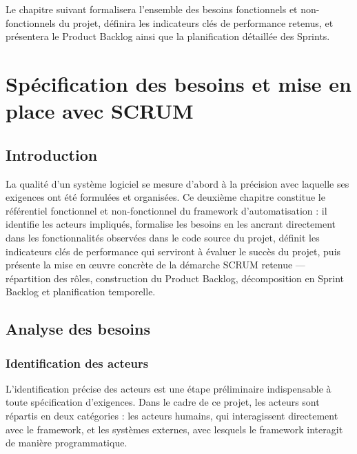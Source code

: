 \documentclass[12pt, a4paper]{report}
\begin{document}
Le chapitre suivant formalisera l'ensemble des besoins fonctionnels et non-fonctionnels du projet, définira les indicateurs clés de performance retenus, et présentera le Product Backlog ainsi que la planification détaillée des Sprints.

\newpage

\chapter{Spécification des besoins et mise en place avec SCRUM}

\section*{Introduction}

La qualité d'un système logiciel se mesure d'abord à la précision avec laquelle ses exigences ont été formulées et organisées. Ce deuxième chapitre constitue le référentiel fonctionnel et non-fonctionnel du framework d'automatisation : il identifie les acteurs impliqués, formalise les besoins en les ancrant directement dans les fonctionnalités observées dans le code source du projet, définit les indicateurs clés de performance qui serviront à évaluer le succès du projet, puis présente la mise en œuvre concrète de la démarche SCRUM retenue — répartition des rôles, construction du Product Backlog, décomposition en Sprint Backlog et planification temporelle.

\section{Analyse des besoins}

\subsection{Identification des acteurs}

L'identification précise des acteurs est une étape préliminaire indispensable à toute spécification d'exigences. Dans le cadre de ce projet, les acteurs sont répartis en deux catégories : les acteurs humains, qui interagissent directement avec le framework, et les systèmes externes, avec lesquels le framework interagit de manière programmatique.
\end{document}
